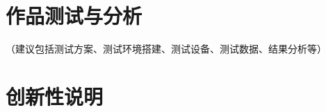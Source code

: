 \documentclass{cumcmthesis}
\numberwithin{equation}{section} %
\numberwithin{figure}{section} %
\numberwithin{table}{section} %
\begin{document}
%

\newpage

\section{作品测试与分析}

（建议包括测试方案、测试环境搭建、测试设备、测试数据、结果分析等）


\newpage

\section{创新性说明}
\end{document}
